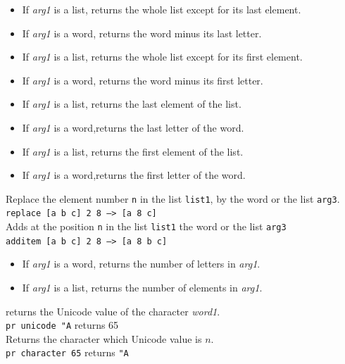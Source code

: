 \noindent
{}
\begin{itemize}
 \item If \textit{arg1} is a list, returns the whole list except for its last element.
 \item If \textit{arg1} is a word, returns the word minus its last letter.
\end{itemize}
\noindent
{}
\begin{itemize}
 \item If \textit{arg1} is a list, returns the whole list except for its first element.
 \item If \textit{arg1} is a word, returns the word minus its first letter.
\end{itemize}
\noindent
{}
\begin{itemize}
 \item If \textit{arg1} is a list, returns the last element of the list. 
 \item If \textit{arg1} is a word,returns the last letter of the word.
\end{itemize}
\noindent
{}
\begin{itemize}
 \item If \textit{arg1} is a list, returns the first element of the list. 
 \item If \textit{arg1} is a word,returns the first letter of the word.
\end{itemize}
\noindent
{}
Replace the element number \texttt{n} in the list \texttt{list1}, by the word or the list \texttt{arg3}.\\
\texttt{replace [a b c] 2 8 ---> [a 8 c]}\\
Adds at the position \texttt{n} in the list \texttt{list1} the word or the list \texttt{arg3}\\
\texttt{additem [a b c] 2 8 ---> [a 8 b c]}\\
\begin{itemize}
 \item If \textit{arg1} is a word, returns the number of letters in \textit{arg1}.
 \item If \textit{arg1} is a list, returns the number of elements in \textit{arg1}.
\end{itemize}
\noindent
{}
returns the Unicode value of the character \textit{word1}. \\
\texttt{pr unicode "A} returns 65\\
Returns the character which Unicode value is $n$.\\
\texttt{pr character 65} returns \texttt{"A}
